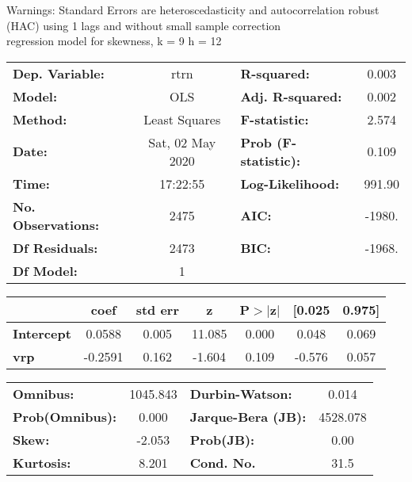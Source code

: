 Warnings: \newline
 [1] Standard Errors are heteroscedasticity and autocorrelation robust (HAC) using 1 lags and without small sample correction\\ 

regression model for skewness, k = 9 h = 12\begin{center}
\begin{tabular}{lclc}
\toprule
\textbf{Dep. Variable:}    &       rtrn       & \textbf{  R-squared:         } &     0.003   \\
\textbf{Model:}            &       OLS        & \textbf{  Adj. R-squared:    } &     0.002   \\
\textbf{Method:}           &  Least Squares   & \textbf{  F-statistic:       } &     2.574   \\
\textbf{Date:}             & Sat, 02 May 2020 & \textbf{  Prob (F-statistic):} &    0.109    \\
\textbf{Time:}             &     17:22:55     & \textbf{  Log-Likelihood:    } &    991.90   \\
\textbf{No. Observations:} &        2475      & \textbf{  AIC:               } &    -1980.   \\
\textbf{Df Residuals:}     &        2473      & \textbf{  BIC:               } &    -1968.   \\
\textbf{Df Model:}         &           1      & \textbf{                     } &             \\
\bottomrule
\end{tabular}
\begin{tabular}{lcccccc}
                   & \textbf{coef} & \textbf{std err} & \textbf{z} & \textbf{P$> |$z$|$} & \textbf{[0.025} & \textbf{0.975]}  \\
\midrule
\textbf{Intercept} &       0.0588  &        0.005     &    11.085  &         0.000        &        0.048    &        0.069     \\
\textbf{vrp}       &      -0.2591  &        0.162     &    -1.604  &         0.109        &       -0.576    &        0.057     \\
\bottomrule
\end{tabular}
\begin{tabular}{lclc}
\textbf{Omnibus:}       & 1045.843 & \textbf{  Durbin-Watson:     } &    0.014  \\
\textbf{Prob(Omnibus):} &   0.000  & \textbf{  Jarque-Bera (JB):  } & 4528.078  \\
\textbf{Skew:}          &  -2.053  & \textbf{  Prob(JB):          } &     0.00  \\
\textbf{Kurtosis:}      &   8.201  & \textbf{  Cond. No.          } &     31.5  \\
\bottomrule
\end{tabular}
\end{center}

